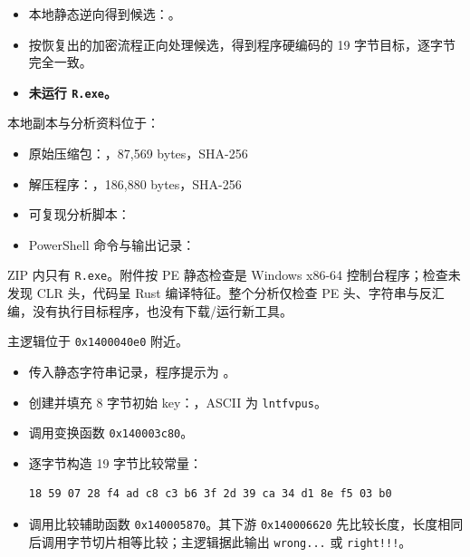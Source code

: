 \begin{itemize}
\tightlist
\item
  本地静态逆向得到候选：\texttt{}。
\item
  按恢复出的加密流程正向处理候选，得到程序硬编码的 19 字节目标，逐字节完全一致。
\item
  \textbf{未运行 \texttt{R.exe}。}
\end{itemize}

本地副本与分析资料位于：

\begin{itemize}
\tightlist
\item
  原始压缩包：\texttt{}，87,569 bytes，SHA-256 \texttt{}
\item
  解压程序：\texttt{}，186,880 bytes，SHA-256 \texttt{}
\item
  可复现分析脚本：\texttt{}
\item
  PowerShell 命令与输出记录：\texttt{}
\end{itemize}

ZIP 内只有 \texttt{R.exe}。附件按 PE 静态检查是 Windows x86-64 控制台程序；检查未发现 CLR 头，代码呈 Rust 编译特征。整个分析仅检查 PE 头、字符串与反汇编，没有执行目标程序，也没有下载/运行新工具。

主逻辑位于 \texttt{0x1400040e0} 附近。

\begin{itemize}
\item
  \texttt{} 传入静态字符串记录，程序提示为 \texttt{}。
\item
  \texttt{} 创建并填充 8 字节初始 key：\texttt{}，ASCII 为 \texttt{lntfvpus}。
\item
  \texttt{} 调用变换函数 \texttt{0x140003c80}。
\item
  \texttt{} 逐字节构造 19 字节比较常量：

\begin{verbatim}
18 59 07 28 f4 ad c8 c3 b6 3f 2d 39 ca 34 d1 8e f5 03 b0
\end{verbatim}
\item
  \texttt{} 调用比较辅助函数 \texttt{0x140005870}。其下游 \texttt{0x140006620} 先比较长度，长度相同后调用字节切片相等比较；主逻辑据此输出 \texttt{wrong...} 或 \texttt{right!!!}。
\end{itemize}

